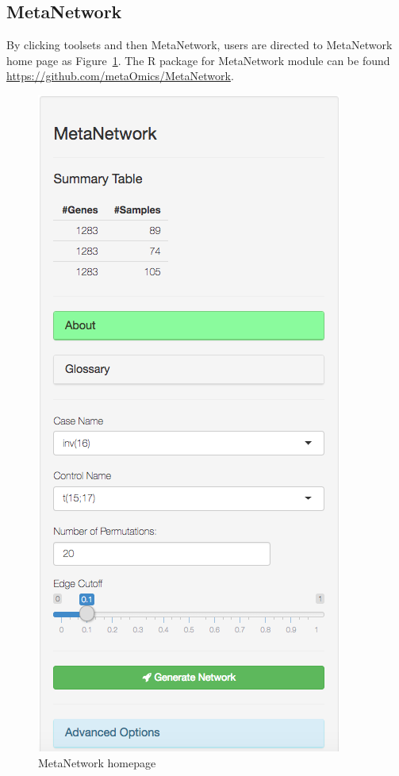 \subsection{MetaNetwork}
By clicking toolsets and then MetaNetwork,
users are directed to MetaNetwork home page as Figure~\ref{fig:MetaNetworkHome}.
The R package for MetaNetwork module can be found \url{https://github.com/metaOmics/MetaNetwork}.

\begin{figure}[H]
\begin{center}
\includegraphics[scale=0.5]{./figure/MetaNetwork/MetaNetworkHome}
\caption{MetaNetwork homepage}
\label{fig:MetaNetworkHome}
\end{center}
\end{figure}

